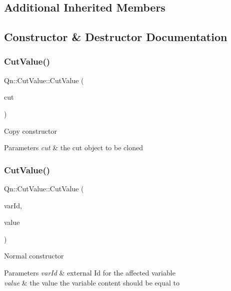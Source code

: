 \subsection*{Additional Inherited Members}


\subsection{Constructor \& Destructor Documentation}
\mbox{\label{classQn_1_1CutValue_af631798a1a977d81ff8fdb37bcb6abd4}} 
\subsubsection{\texorpdfstring{Cut\+Value()}{CutValue()}\hspace{0.1cm}{\footnotesize\ttfamily [1/2]}}
{\footnotesize\ttfamily Qn\+::\+Cut\+Value\+::\+Cut\+Value (\begin{DoxyParamCaption}\item[{const \mbox{\hyperlink{classQn_1_1CutValue}{Cut\+Value}} \&}]{cut }\end{DoxyParamCaption})}

Copy constructor 
\begin{DoxyParams}{Parameters}
{\em cut} & the cut object to be cloned \\
\hline
\end{DoxyParams}
\mbox{\label{classQn_1_1CutValue_a85b618f1f7f26f786311a964bc1509e8}} 
\subsubsection{\texorpdfstring{Cut\+Value()}{CutValue()}\hspace{0.1cm}{\footnotesize\ttfamily [2/2]}}
{\footnotesize\ttfamily Qn\+::\+Cut\+Value\+::\+Cut\+Value (\begin{DoxyParamCaption}\item[{Int\+\_\+t}]{var\+Id,  }\item[{Float\+\_\+t}]{value }\end{DoxyParamCaption})}

Normal constructor 
\begin{DoxyParams}{Parameters}
{\em var\+Id} & external Id for the affected variable \\
\hline
{\em value} & the value the variable content should be equal to \\
\hline
\end{DoxyParams}


